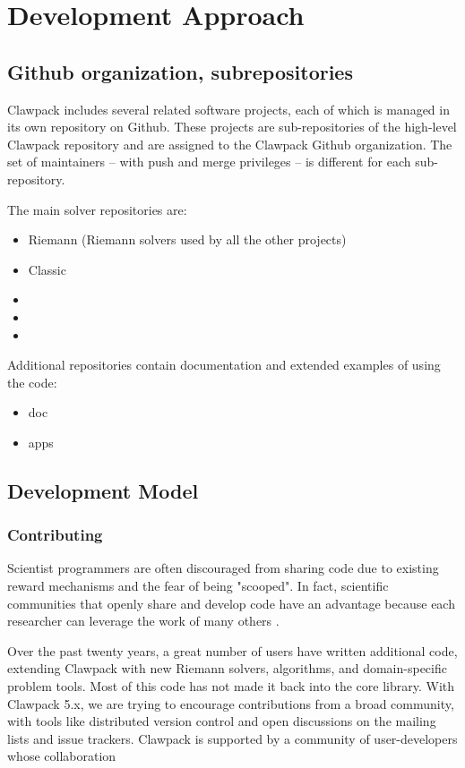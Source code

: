 %
%
%

\section{Development Approach}

\subsection{Github organization, subrepositories}
Clawpack includes several related software projects, each of which is managed
in its own repository on Github.  These projects are sub-repositories of the
high-level Clawpack repository and are assigned to the Clawpack Github
organization.  The set of maintainers -- with push and merge privileges -- is
different for each sub-repository.

The main solver repositories are:
\begin{itemize}
    \item Riemann (Riemann solvers used by all the other projects)
    \item Classic
    \item \amrclaw
    \item \geoclaw
    \item \pyclaw
\end{itemize}

Additional repositories contain documentation and extended examples of using the code:
\begin{itemize}
    \item doc
    \item apps
\end{itemize}

\subsection{Development Model}

\subsubsection{Contributing}
Scientist programmers are often discouraged from sharing code
due to existing reward mechanisms and the fear of being "scooped".
In fact, scientific communities that openly share and develop code
have an advantage because each researcher can leverage the work of
many others \cite{turk2013scaling}.

Over the past twenty years, a great number of users have written
additional code, extending Clawpack with new Riemann solvers,
algorithms, and domain-specific problem tools.  Most of this code
has not made it back into the core library.  With Clawpack 5.x,
we are trying to encourage contributions from a broad community, with
tools like distributed version control and open discussions on 
the mailing lists and issue trackers.
Clawpack is supported by a community of user-developers whose
collaboration

